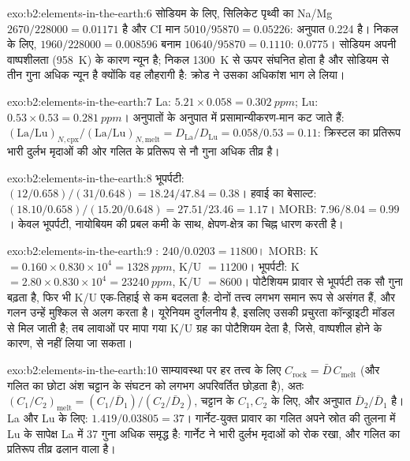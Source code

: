 \begin{solution}{exo:b2:elements-in-the-earth:6}
सोडियम के लिए, सिलिकेट पृथ्वी का Na/Mg $2670/\num{228000} = 0.01171$ है और CI
मान $5010/\num{95870} = 0.05226$: अनुपात 0.224 है। निकल के लिए, $1960/\num{228000}
= 0.008596$ बनाम $\num{10640}/\num{95870} = 0.1110$: 0.0775। सोडियम अपनी
वाष्पशीलता (\qty{958}{K}) के कारण न्यून है; निकल \qty{1300}{K} से ऊपर संघनित होता है और
सोडियम से तीन गुना अधिक न्यून है क्योंकि वह लौहरागी है: क्रोड ने उसका अधिकांश भाग
ले लिया।
\end{solution}

\begin{solution}{exo:b2:elements-in-the-earth:7}
La: $5.21\times0.058 = \qty{0.302}{ppm}$; Lu: $0.53\times0.53 = \qty{0.281}{ppm}$।
अनुपातों के अनुपात में प्रसामान्यीकरण-मान कट जाते हैं:
$(\mathrm{La}/\mathrm{Lu})_{N,\mathrm{cpx}}/(\mathrm{La}/\mathrm{Lu})_{N,\mathrm{melt}} =
D_{\mathrm{La}}/D_{\mathrm{Lu}} = 0.058/0.53 = 0.11$: क्रिस्टल का प्रतिरूप भारी दुर्लभ मृदाओं की ओर
गलित के प्रतिरूप से नौ गुना अधिक तीव्र है।
\end{solution}

\begin{solution}{exo:b2:elements-in-the-earth:8}
भूपर्पटी: $(12/0.658)/(31/0.648) = 18.24/47.84 = 0.38$। हवाई का बेसाल्ट:
$(18.10/0.658)/(15.20/0.648) = 27.51/23.46 = 1.17$। MORB: $7.96/8.04 = 0.99$। केवल
भूपर्पटी, नायोबियम की प्रबल कमी के साथ, क्षेपण-क्षेत्र का चिह्न धारण करती है।
\end{solution}

\begin{solution}{exo:b2:elements-in-the-earth:9}
: $240/0.0203 = \num{11800}$। MORB: K $= 0.160\times0.830\times10^4 =
\qty{1328}{ppm}$, K/U $= \num{11200}$। भूपर्पटी: K $= 2.80\times0.830\times10^4 =
\qty{23240}{ppm}$, K/U $= \num{8600}$। पोटैशियम प्रावार से भूपर्पटी तक सौ गुना बढ़ता है,
फिर भी K/U एक-तिहाई से कम बदलता है: दोनों तत्त्व लगभग समान रूप से असंगत हैं,
और गलन उन्हें मुश्किल से अलग करता है। यूरेनियम दुर्गलनीय है, इसलिए उसकी प्रचुरता
कॉन्ड्राइटी मॉडल से मिल जाती है; तब लावाओं पर मापा गया K/U ग्रह का पोटैशियम देता है, जिसे,
वाष्पशील होने के कारण,  से नहीं लिया जा सकता।
\end{solution}

\begin{solution}{exo:b2:elements-in-the-earth:10}
साम्यावस्था पर हर तत्त्व के लिए $C_{\mathrm{rock}} = \bar D\,C_{\mathrm{melt}}$ (और
गलित का छोटा अंश चट्टान के संघटन को लगभग अपरिवर्तित छोड़ता है), अतः
$(C_1/C_2)_{\mathrm{melt}} = (C_{1}/\bar D_1)/(C_{2}/\bar D_2)$, चट्टान के $C_1,
C_2$ के लिए, और अनुपात $\bar D_2/\bar D_1$ है। La और Lu के लिए: $1.419/0.03805 = 37$। गार्नेट-युक्त
प्रावार का गलित अपने स्रोत की तुलना में Lu के सापेक्ष La में 37 गुना अधिक समृद्ध है: गार्नेट ने
भारी दुर्लभ मृदाओं को रोक रखा, और गलित का प्रतिरूप तीव्र ढलान वाला है।
\end{solution}

